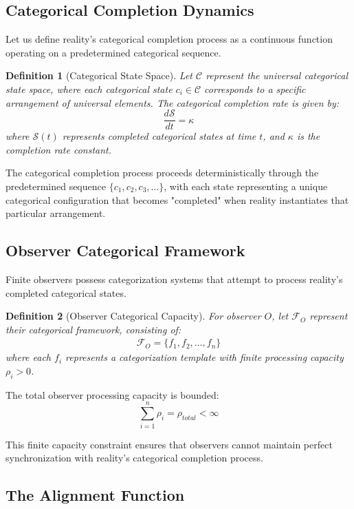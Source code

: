 \documentclass[12pt,a4paper]{article}
\newtheorem{definition}{Definition}
\begin{document}
\subsection{Categorical Completion Dynamics}

Let us define reality's categorical completion process as a continuous function operating on a predetermined categorical sequence.

\begin{definition}[Categorical State Space]
Let $\mathcal{C}$ represent the universal categorical state space, where each categorical state $c_i \in \mathcal{C}$ corresponds to a specific arrangement of universal elements. The categorical completion rate is given by:
$$\frac{d\mathcal{S}}{dt} = \kappa$$
where $\mathcal{S}(t)$ represents completed categorical states at time $t$, and $\kappa$ is the completion rate constant.
\end{definition}

The categorical completion process proceeds deterministically through the predetermined sequence $\{c_1, c_2, c_3, \ldots\}$, with each state representing a unique categorical configuration that becomes "completed" when reality instantiates that particular arrangement.

\subsection{Observer Categorical Framework}

Finite observers possess categorization systems that attempt to process reality's completed categorical states.

\begin{definition}[Observer Categorical Capacity]
For observer $O$, let $\mathcal{F}_O$ represent their categorical framework, consisting of:
\begin{align}
\mathcal{F}_O = \{f_1, f_2, \ldots, f_n\}
\end{align}
where each $f_i$ represents a categorization template with finite processing capacity $\rho_i > 0$.
\end{definition}

The total observer processing capacity is bounded:
$$\sum_{i=1}^{n} \rho_i = \rho_{total} < \infty$$

This finite capacity constraint ensures that observers cannot maintain perfect synchronization with reality's categorical completion process.

\subsection{The Alignment Function}
\end{document}
